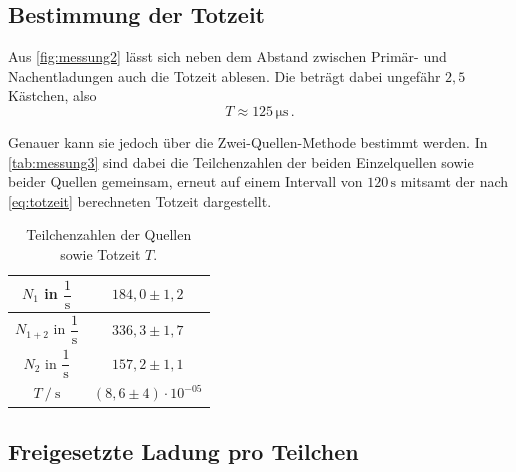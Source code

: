 \subsection{Bestimmung der Totzeit}

Aus \autoref{fig:messung2} lässt sich neben dem Abstand zwischen Primär- und Nachentladungen auch die Totzeit ablesen.
Die beträgt dabei ungefähr $2,5$ Kästchen, also
\begin{equation*}
    T \approx 125 \,\unit{\micro\second} \,.
\end{equation*}

Genauer kann sie jedoch über die Zwei-Quellen-Methode bestimmt werden.
In \autoref{tab:messung3} sind dabei die Teilchenzahlen der beiden Einzelquellen sowie beider Quellen gemeinsam, erneut auf einem Intervall von $120 \,\unit{\second}$ mitsamt der nach \eqref{eq:totzeit} berechneten Totzeit dargestellt.

\begin{table}[H] %
    \centering
    \caption{Teilchenzahlen der Quellen sowie Totzeit $T$.}
    \label{tab:messung3}
    \begin{tabular}{|S | S|}
      \hline
        {$N_1$ in $\dfrac{1}{\unit{\second}}$}                             &  {$184,0 \pm 1,2$}  \\
        \hline
        {$N_{1 + 2}$ in $\dfrac{1}{\unit{\second}}$}                      &  {$336,3 \pm 1,7$}    \\
        \hline
        {$N_2$ in $\dfrac{1}{\unit{\second}}$}                             &  {$157,2 \pm 1,1$}    \\
        \hline
        {$T \mathbin{/} \unit{\second}$}    &  {$(8,6 \pm 4) \cdot 10^{-05}$} \\
    \hline
    \end{tabular}
\end{table}


\subsection{Freigesetzte Ladung pro Teilchen}
\label{subsec:ladung}


